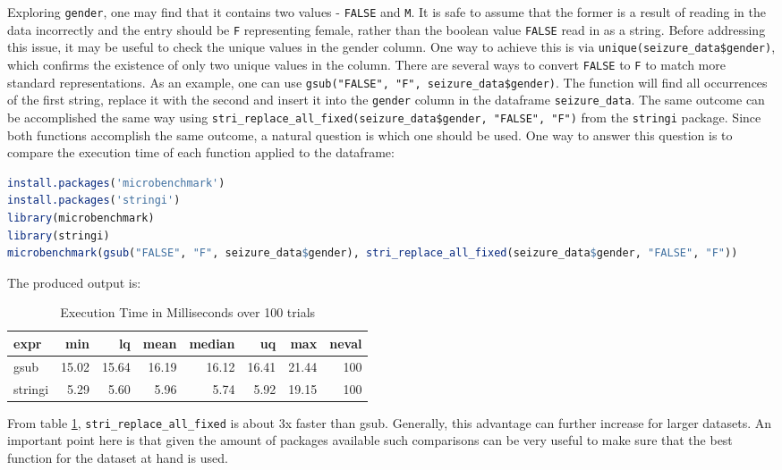 Exploring \verb|gender|, one may find that it contains two values - \verb|FALSE| and \verb|M|. It is safe to assume that the former is a result of reading in the data incorrectly and the entry should be \verb|F| representing female, rather than the boolean value \verb|FALSE| read in as a string. Before addressing this issue, it may be useful to check the unique values in the gender column. One way to achieve this is via \verb|unique(seizure_data$gender)|, which confirms the existence of only two unique values in the column. There are several ways to convert \verb|FALSE| to \verb|F| to match more standard representations. As an example, one can use \verb|gsub("FALSE", "F", seizure_data$gender)|. The function will find all occurrences of the first string, replace it with the second and insert it into the \verb|gender| column in the dataframe \verb|seizure_data|. The same outcome can be accomplished the same way using \verb|stri_replace_all_fixed(seizure_data$gender, "FALSE", "F")| from the \verb|stringi| \cite{stringi} package. Since both functions accomplish the same outcome, a natural question is which one should be used. One way to answer this question is to compare the execution time of each function applied to the dataframe:
\begin{lstlisting}[language=R]
install.packages('microbenchmark')
install.packages('stringi')
library(microbenchmark)
library(stringi)
microbenchmark(gsub("FALSE", "F", seizure_data$gender), stri_replace_all_fixed(seizure_data$gender, "FALSE", "F"))
\end{lstlisting}
The produced output is:
\begin{table}[h]
  \centering
  \label{tab:execution_time}
  \begin{tabular}{lrrrrrrr}
    \hline
    expr & min & lq & mean & median & uq & max & neval \\
    \hline
    gsub & 15.02 & 15.64 & 16.19 & 16.12 & 16.41 & 21.44 & 100 \\
    stringi & 5.29 & 5.60 & 5.96 & 5.74 & 5.92 & 19.15 & 100 \\
    \hline
  \end{tabular}
  \caption{Execution Time in Milliseconds over 100 trials}
  \label{tbl:substr}
\end{table}
From table \ref{tbl:substr}, \verb|stri_replace_all_fixed| is about 3x faster than gsub. Generally, this advantage can further increase for larger datasets. An important point here is that given the amount of packages available such comparisons can be very useful to make sure that the best function for the dataset at hand is used.

